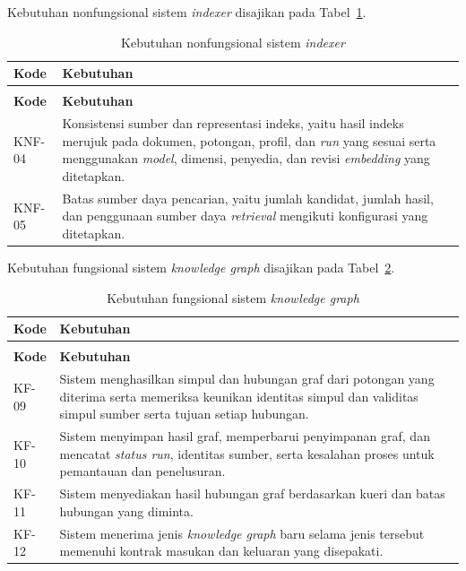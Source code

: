 \noindent Kebutuhan nonfungsional sistem \emph{indexer} disajikan pada Tabel~\ref{tab:knf-indexer}.

\begin{longtable}{>{\RaggedRight\arraybackslash}p{2.2cm} >{\RaggedRight\arraybackslash}p{10.65cm}}
    \caption{Kebutuhan nonfungsional sistem \emph{indexer}}\label{tab:knf-indexer}\\
    \toprule
    \textbf{Kode} & \textbf{Kebutuhan}\\
    \midrule
    \endfirsthead
    \multicolumn{2}{l}{\small\itshape Lanjutan Tabel \ref{tab:knf-indexer}}\\
    \toprule
    \textbf{Kode} & \textbf{Kebutuhan}\\
    \midrule
    \endhead
    \bottomrule
    \endfoot
    KNF-04 & Konsistensi sumber dan representasi indeks, yaitu hasil indeks merujuk pada dokumen, potongan, profil, dan \emph{run} yang sesuai serta menggunakan \emph{model}, dimensi, penyedia, dan revisi \emph{embedding} yang ditetapkan.\\
    KNF-05 & Batas sumber daya pencarian, yaitu jumlah kandidat, jumlah hasil, dan penggunaan sumber daya \emph{retrieval} mengikuti konfigurasi yang ditetapkan.\\
\end{longtable}

\noindent Kebutuhan fungsional sistem \emph{knowledge graph} disajikan pada Tabel~\ref{tab:kf-knowledge-graph}.

\begin{longtable}{>{\RaggedRight\arraybackslash}p{2.2cm} >{\RaggedRight\arraybackslash}p{10.65cm}}
    \caption{Kebutuhan fungsional sistem \emph{knowledge graph}}\label{tab:kf-knowledge-graph}\\
    \toprule
    \textbf{Kode} & \textbf{Kebutuhan}\\
    \midrule
    \endfirsthead
    \multicolumn{2}{l}{\small\itshape Lanjutan Tabel \ref{tab:kf-knowledge-graph}}\\
    \toprule
    \textbf{Kode} & \textbf{Kebutuhan}\\
    \midrule
    \endhead
    \bottomrule
    \endfoot
    KF-09 & Sistem menghasilkan simpul dan hubungan graf dari potongan yang diterima serta memeriksa keunikan identitas simpul dan validitas simpul sumber serta tujuan setiap hubungan.\\
    KF-10 & Sistem menyimpan hasil graf, memperbarui penyimpanan graf, dan mencatat \emph{status run}, identitas sumber, serta kesalahan proses untuk pemantauan dan penelusuran.\\
    KF-11 & Sistem menyediakan hasil hubungan graf berdasarkan kueri dan batas hubungan yang diminta.\\
    KF-12 & Sistem menerima jenis \emph{knowledge graph} baru selama jenis tersebut memenuhi kontrak masukan dan keluaran yang disepakati.\\
\end{longtable}

